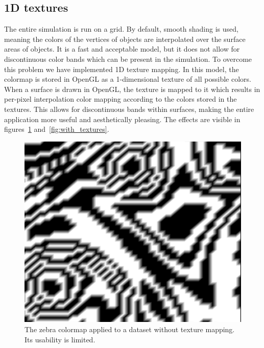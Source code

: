 	\subsection{1D textures}
		The entire simulation is run on a grid.
		By default, smooth shading is used, meaning the colors of the vertices of objects are interpolated over the surface areas of objects.
		It is a fast and acceptable model, but it does not allow for discontinuous color bands which can be present in the simulation.
		To overcome this problem we have implemented 1D texture mapping.
		In this model, the colormap is stored in OpenGL as a 1-dimensional texture of all possible colors.
		When a surface is drawn in OpenGL, the texture is mapped to it which results in per-pixel interpolation color mapping according to the colors stored in the textures. 
		This allows for discontinuous bands within surfaces, making the entire application more useful and aesthetically pleasing.
		The effects are visible in figures~\ref{fig:without_textures} and~\ref{fig:with_textures}.
		\begin{figure}[htb]
			  \centering
			  \includegraphics[scale=.2]{./content/pictures/zebra_regular.png}
			  \caption{The zebra colormap applied to a dataset without texture mapping. Its usability is limited.}
			  \label{fig:without_textures}
		\end{figure}
